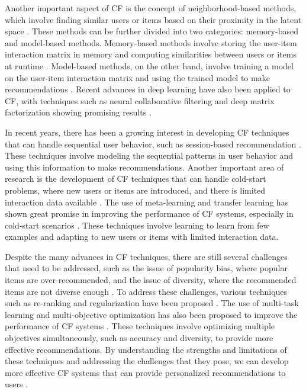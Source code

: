 \documentclass[11pt,a4paper]{article}
\begin{document}
Another important aspect of CF is the concept of neighborhood-based methods, which involve finding similar users or items based on their proximity in the latent space \cite{doi:10.1007/978-1-0716-2197-4_2}. These methods can be further divided into two categories: memory-based and model-based methods. Memory-based methods involve storing the user-item interaction matrix in memory and computing similarities between users or items at runtime \cite{doi:10.1007/978-1-0716-2197-4_4}. Model-based methods, on the other hand, involve training a model on the user-item interaction matrix and using the trained model to make recommendations \cite{doi:10.1145/3485447.3512082}. Recent advances in deep learning have also been applied to CF, with techniques such as neural collaborative filtering and deep matrix factorization showing promising results \cite{arxiv:1810.07076}.

In recent years, there has been a growing interest in developing CF techniques that can handle sequential user behavior, such as session-based recommendation \cite{doi:10.1145/3488560.3498464}. These techniques involve modeling the sequential patterns in user behavior and using this information to make recommendations. Another important area of research is the development of CF techniques that can handle cold-start problems, where new users or items are introduced, and there is limited interaction data available \cite{doi:10.1145/3292500.3330859}. The use of meta-learning and transfer learning has shown great promise in improving the performance of CF systems, especially in cold-start scenarios \cite{arxiv:2206.04415}. These techniques involve learning to learn from few examples and adapting to new users or items with limited interaction data.

Despite the many advances in CF techniques, there are still several challenges that need to be addressed, such as the issue of popularity bias, where popular items are over-recommended, and the issue of diversity, where the recommended items are not diverse enough \cite{arxiv:1907.13286}. To address these challenges, various techniques such as re-ranking and regularization have been proposed \cite{arxiv:1901.07555}. The use of multi-task learning and multi-objective optimization has also been proposed to improve the performance of CF systems \cite{doi:10.1145/3580305.3599869}. These techniques involve optimizing multiple objectives simultaneously, such as accuracy and diversity, to provide more effective recommendations. By understanding the strengths and limitations of these techniques and addressing the challenges that they pose, we can develop more effective CF systems that can provide personalized recommendations to users \cite{arxiv:2208.12397}. 
\end{document}

